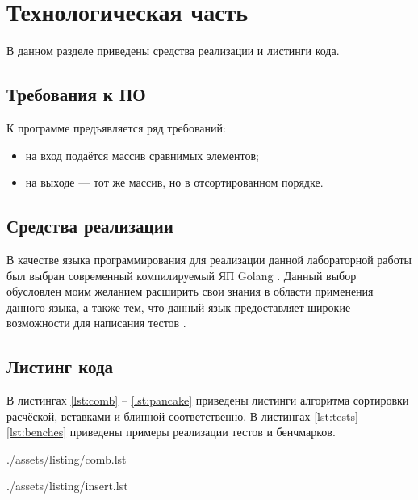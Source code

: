 \chapter{Технологическая часть}

В данном разделе приведены средства реализации и листинги кода.

\section{Требования к ПО}

К программе предъявляется ряд требований:
\begin{itemize}
	\item на вход подаётся массив сравнимых элементов;
	\item на выходе — тот же массив, но в отсортированном порядке.
\end{itemize}

\section{Средства реализации}

В качестве языка программирования для реализации данной лабораторной работы был выбран современный компилируемый ЯП Golang \cite{golang}.
Данный выбор обусловлен моим желанием расширить свои знания в области применения данного языка, а также тем, что данный язык предоставляет широкие возможности для написания тестов \cite{gotest}.

\section{Листинг кода}

В листингах \ref{lst:comb} -- \ref{lst:pancake} приведены листинги алгоритма сортировки расчёской, вставками и блинной соответственно.
В листингах \ref{lst:tests} -- \ref{lst:benches} приведены примеры реализации тестов и бенчмарков.

\clearpage
\begin{lstinputlisting}[
	caption={Алгоритм сортировки расчёской},
	label={lst:comb},
	style={golang}
]{./assets/listing/comb.lst}
\end{lstinputlisting}

\begin{lstinputlisting}[
	caption={Алгоритм сортировки вставками},
	label={lst:insert},
	style={golang}
]{./assets/listing/insert.lst}
\end{lstinputlisting}

